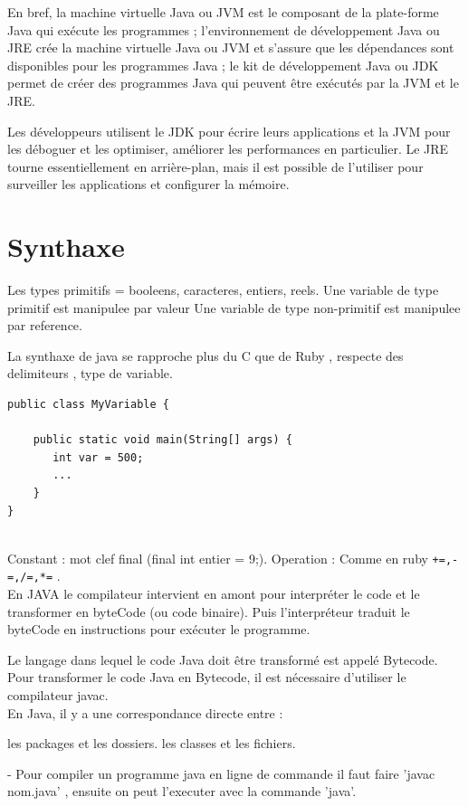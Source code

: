 \documentclass[a4paper,12pt,openany]{book}
\begin{document}
En bref, la machine virtuelle Java ou JVM est le composant de la plate-forme Java qui exécute les programmes ; l’environnement de développement Java ou JRE crée la machine virtuelle Java ou JVM et s'assure que les dépendances sont disponibles pour les programmes Java ; le kit de développement Java ou JDK permet de créer des programmes Java qui peuvent être exécutés par la JVM et le JRE.

Les développeurs utilisent le JDK pour écrire leurs applications et la JVM pour les déboguer et les optimiser, améliorer les performances en particulier. Le JRE tourne essentiellement en arrière-plan, mais il est possible de l'utiliser pour surveiller les applications et configurer la mémoire.

\section{Synthaxe}

Les types primitifs = booleens, caracteres, entiers, reels.
Une variable de type primitif est manipulee par valeur
Une variable de type non-primitif est manipulee par reference.

La synthaxe de java se rapproche plus du C que de Ruby , respecte des delimiteurs , type de variable.
\begin{verbatim}
public class MyVariable {

	public static void main(String[] args) {
	   int var = 500;
	   ...
	}
}
\end{verbatim}

\\
Constant : mot clef final (final int entier = 9;).
Operation : Comme en ruby \verb!+=,-=,/=,*=! .
\\
En JAVA le compilateur intervient en amont pour interpréter le code et le transformer en byteCode (ou code binaire). Puis l'interpréteur traduit le byteCode en instructions pour exécuter le programme.

Le langage dans lequel le code Java doit être transformé est appelé Bytecode. Pour transformer le code Java en Bytecode, il est nécessaire d'utiliser le compilateur javac.
\\

En Java, il y a une correspondance directe entre :

les packages et les dossiers.
les classes et les fichiers.

- Pour compiler un programme java en ligne de commande il faut faire 'javac nom.java' , ensuite on peut l'executer avec la commande 'java'.
\end{document}
